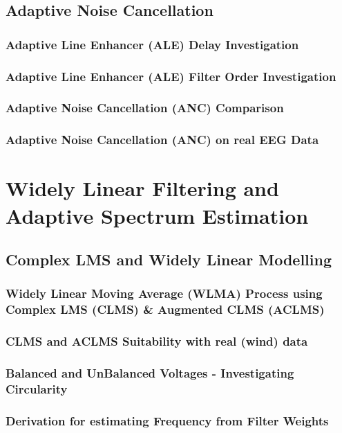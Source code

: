 \documentclass[12pt]{article}
\begin{document}
	\subsection{Adaptive Noise Cancellation} \label{sec: 2-3-ANC}
		\subsubsection{Adaptive Line Enhancer (ALE) Delay Investigation}
		\subsubsection{Adaptive Line Enhancer (ALE) Filter Order Investigation}
		\subsubsection{Adaptive Noise Cancellation (ANC) Comparison}
		\subsubsection{Adaptive Noise Cancellation (ANC) on real EEG Data}
	
\pagebreak
\section{Widely Linear Filtering and Adaptive Spectrum Estimation} \label{sec: 3-WLASE}
	\subsection{Complex LMS and Widely Linear Modelling} \label{sec: 3-1-CLMS-ACLMS}
		\subsubsection{Widely Linear Moving Average (WLMA) Process using Complex LMS (CLMS) \& Augmented CLMS (ACLMS)}
		\subsubsection{CLMS and ACLMS Suitability with real (wind) data}
		\subsubsection{Balanced and UnBalanced Voltages - Investigating Circularity}
		\subsubsection{Derivation for estimating Frequency from Filter Weights}
\end{document}
